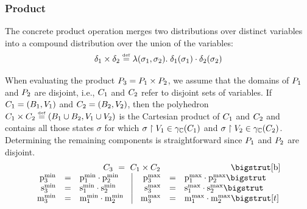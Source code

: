 
\subsubsection{Product}
The concrete product operation merges two distributions over distinct
variables into a compound distribution over the union of the
variables:
$$ \delta_1 \times \delta_2 \stackrel{\smash{\scriptscriptstyle \mathrm{def}}}= \lambda(\sigma_1, \sigma_2) . \;
\delta_1(\sigma_1) \cdot \delta_2(\sigma_2) $$

When evaluating the product $P_{3} = P_{1} \times P_{2}$, we assume
that the domains of $P_{1}$ and $P_{2}$ are disjoint, i.e.,
$C_1$ and $C_2$ refer to disjoint sets of 
variables.  If $ C_1 = (B_1, V_1) $ and $ C_2 = (B_2,
V_2) $, then the polyhedron $C_1 \times C_2 \stackrel{\smash{\scriptscriptstyle \mathrm{def}}}=
\left( B_1 \cup B_2, V_1 \cup V_2 \right)$ is the Cartesian product
of $C_1$ and $C_2$ and contains all those states $\sigma$ for
which $\sigma \upharpoonright V_1 \in \gamma_{\mathbb{C}}(C_1)$ and
$\sigma \upharpoonright V_2 \in \gamma_{\mathbb{C}}(C_2)$. 
Determining the remaining components is straightforward since $P_{1}$
and $P_{2}$ are disjoint. 
\[
\begin{array}{rcl@{\hspace{0.35cm}}|@{\hspace{0.35cm}}rcl}
\multicolumn{6}{c}{\poly_3\ =\ \poly_1 \pprod \poly_2} \bigstrut[b] \\
\pmin{3} &=& \pmin{1} \cdot \pmin{2} &
\pmax{3} &=& \pmax{1} \cdot \pmax{2} \bigstrut \\
\smin{3} &=& \smin{1} \cdot \smin{2} &
\smax{3} &=& \smax{1} \cdot \smax{2} \bigstrut \\
\mmin{3} &=& \mmin{1} \cdot \mmin{2} &
\mmax{3} &=& \mmax{1} \cdot \mmax{2} \bigstrut[t]
\end{array}
\]

